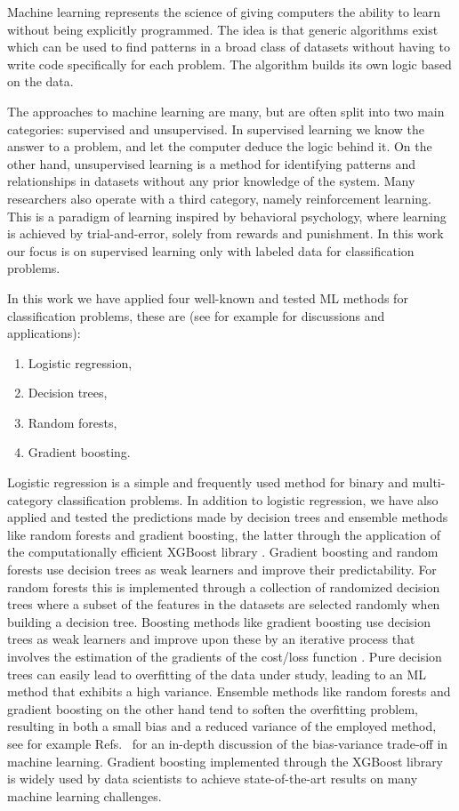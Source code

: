 \documentclass[superscriptaddress,
preprint,
 amsmath,amssymb,
 aps,
]{revtex4-2}
\begin{document}
Machine learning represents the science of giving computers the ability to learn without being explicitly programmed. The idea is that generic algorithms exist which can be used to find patterns in a broad class of datasets without having to write code specifically for each problem. The algorithm builds its own logic based on the data. 

The approaches to machine learning are many, but are often split into two main categories: supervised and unsupervised. In supervised learning we know the answer to a problem, and let the computer deduce the logic behind it. On the other hand, unsupervised learning is a method for identifying patterns and relationships in datasets without any prior knowledge of the system. Many researchers also operate with a third category, namely reinforcement learning. This is a paradigm of learning inspired by behavioral psychology, where learning is achieved by trial-and-error, solely from rewards and punishment. In this work our focus is on supervised learning only with labeled data for classification problems.

In this work we have applied four well-known and tested ML methods for classification problems, these are (see for example \cite{Hastie2009,Mehta2019} for discussions and applications):
\begin{enumerate}
    \item Logistic regression,
    \item Decision trees,
    \item Random forests,
    \item Gradient boosting.
\end{enumerate}
Logistic regression \cite{Hastie2009} is a simple and frequently used method for binary and multi-category classification problems. In addition to logistic regression, we have also applied and tested the predictions made by decision trees and ensemble methods like random forests and gradient boosting, the latter through the application of the computationally efficient XGBoost library \cite{xgboost2016}. Gradient boosting and random forests use decision trees as weak learners and improve their predictability. For random forests this is implemented through a collection of randomized decision trees where a subset of the features in the datasets are selected randomly when building a decision tree. Boosting methods like gradient boosting use decision trees as weak learners and improve upon these by an iterative process that involves the estimation of the gradients of the cost/loss function  \cite{Hastie2009}. Pure decision trees can easily lead to overfitting of the data under study, leading to an ML method that exhibits a high variance. Ensemble methods like random forests and gradient boosting on the other hand tend to soften the overfitting problem, resulting in both a small bias and a reduced variance of the employed method, see for example Refs.~\cite{Hastie2009,Mehta2019} for an in-depth discussion of the bias-variance trade-off in machine learning. Gradient boosting implemented through the  XGBoost library \cite{xgboost2016} is widely used by data scientists to achieve state-of-the-art results on many machine learning challenges. 
\end{document}
